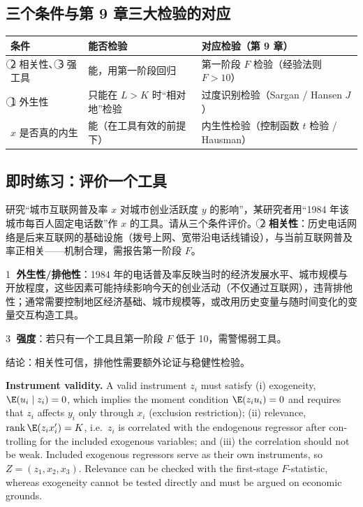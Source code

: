 \subsection{三个条件与第 9 章三大检验的对应}

\begin{center}
\small
\begin{tabularx}{\linewidth}{>{\raggedright\arraybackslash}p{3.3cm}LL}
\toprule
条件 & 能否检验 & 对应检验（第 9 章）\\
\midrule
\textcircled{\scriptsize 2} 相关性、\textcircled{\scriptsize 3} 强工具 & 能，用第一阶段回归 & 第一阶段 $F$ 检验（经验法则 $F>10$）\\
\textcircled{\scriptsize 1} 外生性 & 只能在 $L>K$ 时“相对地”检验 & 过度识别检验（Sargan / Hansen $J$）\\
$x$ 是否真的内生 & 能（在工具有效的前提下） & 内生性检验（控制函数 $t$ 检验 / Hausman）\\
\bottomrule
\end{tabularx}
\end{center}

\subsection{即时练习：评价一个工具}

\begin{prac}[评价一个工具]\label{pr:U08a-eval}
研究“城市互联网普及率 $x$ 对城市创业活跃度 $y$ 的影响”，某研究者用“1984 年该城市每百人固定电话数”作 $x$ 的工具。请从三个条件评价。
\answer
\textcircled{\scriptsize 2} \textbf{相关性}：历史电话网络是后来互联网的基础设施（拨号上网、宽带沿电话线铺设），与当前互联网普及率正相关——机制合理，需报告第一阶段 $F$。

\textcircled{\scriptsize 1} \textbf{外生性/排他性}：1984 年的电话普及率反映当时的经济发展水平、城市规模与开放程度，这些因素可能持续影响今天的创业活动（不仅通过互联网），违背排他性；通常需要控制地区经济基础、城市规模等，或改用历史变量与随时间变化的变量交互构造工具。

\textcircled{\scriptsize 3} \textbf{强度}：若只有一个工具且第一阶段 $F$ 低于 10，需警惕弱工具。

结论：相关性可信，排他性需要额外论证与稳健性检验。
\end{prac}

\begin{english}
\textbf{Instrument validity.} A valid instrument $z_i$ must satisfy (i) exogeneity, $\E(u_i\mid z_i)=0$, which implies the moment condition $\E(z_iu_i)=0$ and requires that $z_i$ affects $y_i$ only through $x_i$ (exclusion restriction); (ii) relevance, $\operatorname{rank}\E(z_ix_i')=K$, i.e.\ $z_i$ is correlated with the endogenous regressor after controlling for the included exogenous variables; and (iii) the correlation should not be weak. Included exogenous regressors serve as their own instruments, so $Z=(z_1,x_2,x_3)$. Relevance can be checked with the first-stage $F$-statistic, whereas exogeneity cannot be tested directly and must be argued on economic grounds.
\end{english}

